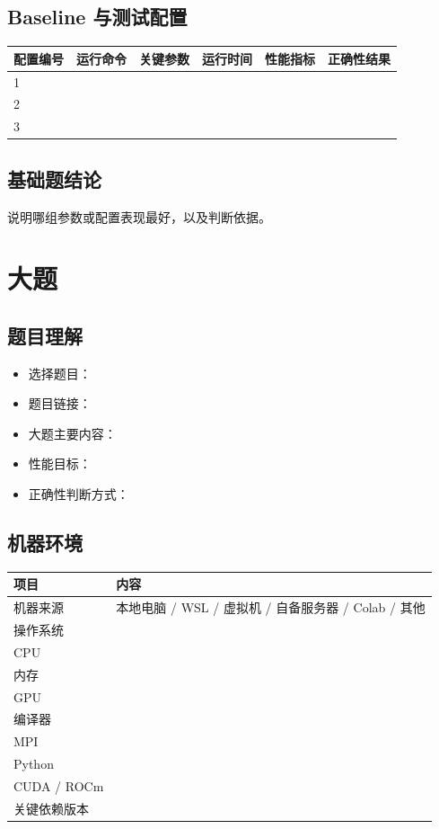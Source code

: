 \documentclass[UTF8]{ctexart}
\begin{document}
\subsection{Baseline 与测试配置}

\begin{tabular}{llllll}
\toprule
配置编号 & 运行命令 & 关键参数 & 运行时间 & 性能指标 & 正确性结果 \\
\midrule
1 &  &  &  &  &  \\
2 &  &  &  &  &  \\
3 &  &  &  &  &  \\
\bottomrule
\end{tabular}

\subsection{基础题结论}

说明哪组参数或配置表现最好，以及判断依据。

\section{大题}

\subsection{题目理解}

\begin{itemize}
\item 选择题目：
\item 题目链接：
\item 大题主要内容：
\item 性能目标：
\item 正确性判断方式：
\end{itemize}

\subsection{机器环境}

\begin{tabular}{ll}
\toprule
项目 & 内容 \\
\midrule
机器来源 & 本地电脑 / WSL / 虚拟机 / 自备服务器 / Colab / 其他 \\
操作系统 &  \\
CPU &  \\
内存 &  \\
GPU &  \\
编译器 &  \\
MPI &  \\
Python &  \\
CUDA / ROCm &  \\
关键依赖版本 &  \\
\bottomrule
\end{tabular}
\end{document}
